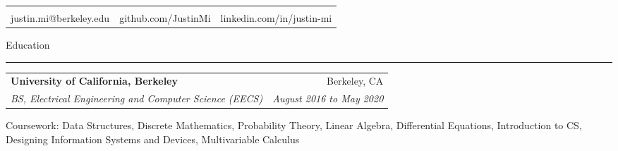 \documentclass[11pt,letterpaper]{article}
\makeatletter
\newenvironment{topic}[1]
    {
    {\Large \centerline{#1}}
    \vspace*{0.03in}
    \hrule 
    \vspace*{0.05in}
    }
    {}
\newenvironment{event}
    {
    \begin{tabular*}{\textwidth}{l@{\extracolsep{\fill}}r}
    }
    {
    \end{tabular*}
    }
\newenvironment{detail}
    {
    \normalsize
    }
    {
    \vspace*{0.02in}
    }
\newenvironment{head}
    {
    \begin{center}
    \begin{tabular*}{\textwidth}{@{\extracolsep{\fill}} l c r}
    }
    {
    \hline
    \hline
    \end{tabular*}
    \end{center}
    }
\makeatother
\begin{document}
    \begin{head}
                           & \huge{\textbf{\sc{Justin Mi}}} \\
    justin.mi@berkeley.edu  & github.com/JustinMi & linkedin.com/in/justin-mi \\
    \end{head} \vspace*{0.1in}





    \begin{topic}{Education}
        \begin{event}
            \textbf{University of California, Berkeley} & Berkeley, CA \\
            \emph{BS, Electrical Engineering and Computer Science (EECS)} & \emph{August 2016 to May 2020}        
        \end{event}
            \begin{detail}
                Coursework: Data Structures, Discrete Mathematics, Probability Theory,  Linear Algebra, Differential Equations, Introduction to CS, Designing Information Systems and Devices, Multivariable Calculus            
            \end{detail}
    \end{topic} \vspace*{0.1in}
\end{document}
